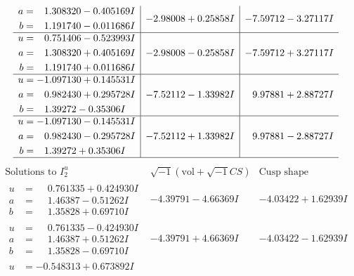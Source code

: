 \documentclass[1p]{elsarticle_modified}
\theoremstyle{definition}
\newcommand{\I}{\sqrt{-1}}
\begin{document}
$$\begin{array}{c|c|c}
\begin{aligned}
a &= \phantom{-}1.308320 - 0.405169 I \\
b &= \phantom{-}1.191740 - 0.011686 I\end{aligned}
 & -2.98008 + 0.25858 I & -7.59712 - 3.27117 I \\ \hline\begin{aligned}
u &= \phantom{-}0.751406 - 0.523993 I \\
a &= \phantom{-}1.308320 + 0.405169 I \\
b &= \phantom{-}1.191740 + 0.011686 I\end{aligned}
 & -2.98008 - 0.25858 I & -7.59712 + 3.27117 I \\ \hline\begin{aligned}
u &= -1.097130 + 0.145531 I \\
a &= \phantom{-}0.982430 + 0.295728 I \\
b &= \phantom{-}1.39272 - 0.35306 I\end{aligned}
 & -7.52112 - 1.33982 I & \phantom{-}9.97881 + 2.88727 I \\ \hline\begin{aligned}
u &= -1.097130 - 0.145531 I \\
a &= \phantom{-}0.982430 - 0.295728 I \\
b &= \phantom{-}1.39272 + 0.35306 I\end{aligned}
 & -7.52112 + 1.33982 I & \phantom{-}9.97881 - 2.88727 I\\
 \hline 
 \end{array}$$\newpage$$\begin{array}{c|c|c}  
\text{Solutions to }I^u_{2}& \I (\text{vol} + \sqrt{-1}CS) & \text{Cusp shape}\\
 \hline 
\begin{aligned}
u &= \phantom{-}0.761335 + 0.424930 I \\
a &= \phantom{-}1.46387 - 0.51262 I \\
b &= \phantom{-}1.35828 + 0.69710 I\end{aligned}
 & -4.39791 - 4.66369 I & -4.03422 + 1.62939 I \\ \hline\begin{aligned}
u &= \phantom{-}0.761335 - 0.424930 I \\
a &= \phantom{-}1.46387 + 0.51262 I \\
b &= \phantom{-}1.35828 - 0.69710 I\end{aligned}
 & -4.39791 + 4.66369 I & -4.03422 - 1.62939 I \\ \hline\begin{aligned}
u &= -0.548313 + 0.673892 I \\

\end{aligned}
\end{array}$$
\end{document}
